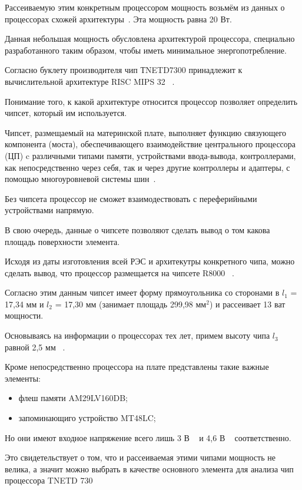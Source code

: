 Рассеиваемую этим конкретным процессором мощность возьмём из данных о
процессорах схожей архитектуры~\cite{R10000-Derivatives}.
Эта мощность равна 20 Вт. 

Данная небольшая мощность обусловлена архитектурой процессора,
специально разработанного таким образом, чтобы иметь минимальное
энергопотребление.

Согласно буклету производителя чип ТNETD7300 принадлежит к
вычислительной архитектуре RISC MIPS 32 ~\cite{AR7-fact-sheet}.

Понимание того, к какой архитектуре относится процессор позволяет
определить чипсет, который им используется.

Чипсет, размещаемый на материнской плате, выполняет функцию связующего
компонента (моста), обеспечивающего взаимодействие центрального
процессора (ЦП) c различными типами памяти, устройствами ввода-вывода,
контроллерами, как непосредственно через себя, так и через другие
контроллеры и адаптеры, с помощью многоуровневой системы
шин~\cite{Avdeev2019}.


Без чипсета процессор не сможет взаимодествовать с переферийными
устройствами напрямую.

В свою очередь, данные о
чипсете позволяют сделать вывод о том какова площадь поверхности
элемента.


Исходя из даты изготовления всей РЭС и архитекутры конкретного чипа,
можно сделать вывод, что процессор размещается на чипсете R8000
~\cite{R8000-physical-wikipedia}.

Согласно этим данным чипсет имеет форму прямоугольника со сторонами в
$l_1$ = 17,34 мм и $l_2$ = 17,30 мм (занимает площадь 299,98 мм$^2$) и
рассеивает 13 ват мощности.


Основываясь на информации о процессорах тех лет, примем высоту чипа
$l_3$ равной 2,5 мм ~\cite{MobilePentium3-wikipedia}.


Кроме непосредственно процессора на плате представлены такие важные элементы:
\begin{itemize}[nosep]
\item флеш памяти AM29LV160DB;
\item запоминающиго устройство MT48LC;
\end{itemize}

Но они имеют входное напряжение всего лишь 3 В ~\cite{SDRAM-Datasheet}
и 4,6 В ~\cite{FlashMemoryDatasheet}
соответственно.

Это свидетельствует о том, что и рассеиваемая этими чипами мощность не
велика, а значит можно выбрать в качестве основного элемента для
анализа чип процессора TNETD 730


